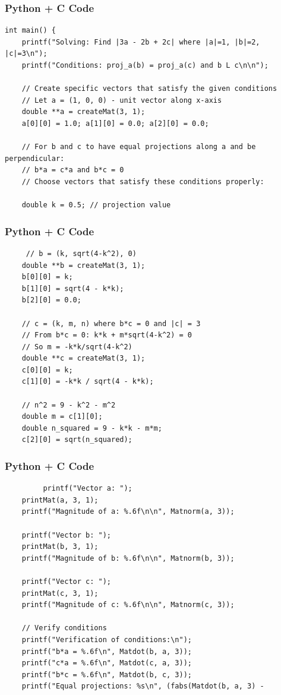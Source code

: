 \documentclass{beamer}
\begin{document}
\begin{frame}[fragile]
    \frametitle{Python + C Code}
    \begin{lstlisting}
int main() {
    printf("Solving: Find |3a - 2b + 2c| where |a|=1, |b|=2, |c|=3\n");
    printf("Conditions: proj_a(b) = proj_a(c) and b L c\n\n");
    
    // Create specific vectors that satisfy the given conditions
    // Let a = (1, 0, 0) - unit vector along x-axis
    double **a = createMat(3, 1);
    a[0][0] = 1.0; a[1][0] = 0.0; a[2][0] = 0.0;
    
    // For b and c to have equal projections along a and be perpendicular:
    // b*a = c*a and b*c = 0
    // Choose vectors that satisfy these conditions properly:
    
    double k = 0.5; // projection value
    \end{lstlisting}
\end{frame}

\begin{frame}[fragile]
    \frametitle{Python + C Code}
    \begin{lstlisting}
     // b = (k, sqrt(4-k^2), 0)
    double **b = createMat(3, 1);
    b[0][0] = k;
    b[1][0] = sqrt(4 - k*k);
    b[2][0] = 0.0;
    
    // c = (k, m, n) where b*c = 0 and |c| = 3
    // From b*c = 0: k*k + m*sqrt(4-k^2) = 0
    // So m = -k*k/sqrt(4-k^2)
    double **c = createMat(3, 1);
    c[0][0] = k;
    c[1][0] = -k*k / sqrt(4 - k*k);
    
    // n^2 = 9 - k^2 - m^2
    double m = c[1][0];
    double n_squared = 9 - k*k - m*m;
    c[2][0] = sqrt(n_squared);
    \end{lstlisting}
\end{frame}

\begin{frame}[fragile]
    \frametitle{Python + C Code}
    \begin{lstlisting}
         printf("Vector a: ");
    printMat(a, 3, 1);
    printf("Magnitude of a: %.6f\n\n", Matnorm(a, 3));
    
    printf("Vector b: ");
    printMat(b, 3, 1);
    printf("Magnitude of b: %.6f\n\n", Matnorm(b, 3));
    
    printf("Vector c: ");
    printMat(c, 3, 1);
    printf("Magnitude of c: %.6f\n\n", Matnorm(c, 3));
    
    // Verify conditions
    printf("Verification of conditions:\n");
    printf("b*a = %.6f\n", Matdot(b, a, 3));
    printf("c*a = %.6f\n", Matdot(c, a, 3));
    printf("b*c = %.6f\n", Matdot(b, c, 3));
    printf("Equal projections: %s\n", (fabs(Matdot(b, a, 3) - 
    \end{lstlisting}
\end{frame}
\end{document}
